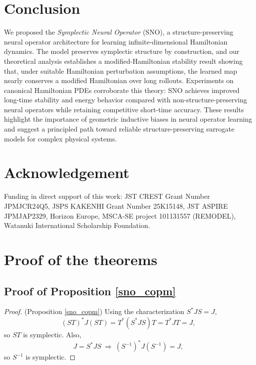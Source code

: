 \documentclass{article}
\theoremstyle{plain}
\theoremstyle{definition}
\theoremstyle{remark}
\begin{document}
\section{Conclusion}
We proposed the \emph{Symplectic Neural Operator} (SNO), a structure-preserving neural
operator architecture for learning infinite-dimensional Hamiltonian dynamics. The model
preserves symplectic structure by construction, and our theoretical analysis establishes a
modified-Hamiltonian stability result showing that, under suitable Hamiltonian perturbation
assumptions, the learned map nearly conserves a modified Hamiltonian over long rollouts.
Experiments on canonical Hamiltonian PDEs corroborate this theory: SNO achieves improved
long-time stability and energy behavior compared with non-structure-preserving neural
operators while retaining competitive short-time accuracy. These results highlight the
importance of geometric inductive biases in neural operator learning and suggest a principled
path toward reliable structure-preserving surrogate models for complex physical systems.

\section*{Acknowledgement}
Funding in direct support of this work: JST CREST Grant Number %
JPMJCR24Q5,
JSPS KAKENHI Grant Number 25K15148, JST ASPIRE JPMJAP2329, Horizon Europe, MSCA-SE project
101131557 (REMODEL),
Watanuki International Scholarship Foundation.




\appendix
\section{Proof of the theorems}


\subsection{Proof of Proposition \ref{sno_copm}}
\begin{proof}(Proposition \ref{sno_copm})
Using the characterization $S^*JS=J$,
\[
(ST)^*J(ST)=T^*(S^*JS)T=T^*JT=J,
\]
so $ST$ is symplectic. Also,
\[
J = S^*JS \ \Longrightarrow\ (S^{-1})^*J(S^{-1})=J,
\]
so $S^{-1}$ is symplectic.
\end{proof}
\end{document}
